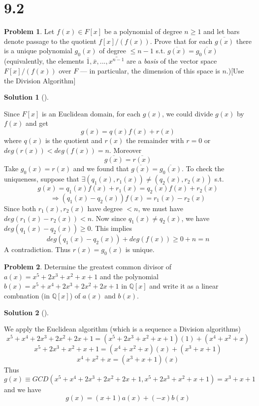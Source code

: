 \documentclass{article}
\theoremstyle{definition}
\newtheorem{prob}{Problem}
\newtheorem*{sol}{Solution}
\newenvironment{sols}[1][]{%
  \begin{sol}[#1]$ $\par\nobreak\ignorespaces
}{%
  \end{sol}
}
\begin{document}
\section*{9.2}

\setcounter{prob}{0}
\begin{prob}
  Let $f(x) \in F[x]$ be a polynomial of degree $n \geq 1$ and let bars denote passage to the quotient $f[x]/(f(x))$. Prove that for each $\overline{g(x)}$ there is a unique polynomial $g_0(x)$ of degree $\leq n - 1$ s.t. $\overline{g(x)} = \overline{g_0(x)}$ (equivalently, the elements $\bar{1}, \bar{x}, ...,\bar{x^{n - 1}}$ are a \textit{basis} of the vector space $F[x]/(f(x))$ over $F$ --- in particular, the dimension of this space is $n$.)[Use the Division Algorithm]
\end{prob}

\begin{sols}
  Since $F[x]$ is an Euclidean domain, for each $g(x)$, we could divide $g(x)$ by $f(x)$ and get
  \[
    g(x) = q(x) f(x) + r(x)
  \]
  where $q(x)$ is the quotient and $r(x)$ the remainder with $r = 0$ or $deg(r(x)) < deg(f(x)) = n$. Moreover
  \[
    \overline{g(x)} = \overline{r(x)}
  \]
  Take $g_0(x) = r(x)$ and we found that $\overline{g(x)} = \overline{g_0(x)}$. To check the uniqueness, suppose that $\exists (q_1(x), r_1(x)) \neq (q_2(x), r_2(x))$ s.t.
  \[
    g(x) = q_1(x) f(x) + r_1(x) = q_2(x) f(x) + r_2(x)
  \]
  \[
    \Rightarrow (q_1(x) - q_2(x)) f(x) = r_1(x) - r_2(x)
  \]
  Since both $r_1(x), r_2(x)$ have degree $<n$, we must have $deg(r_1(x) - r_2(x)) < n$. Now since $q_1(x) \neq q_2(x)$, we have $deg(q_1(x) - q_2(x)) \geq 0$. This implies 
  \[
    deg(q_1(x) - q_2(x)) + deg(f(x)) \geq 0 + n = n
  \]
  A contradiction. Thus $r(x) = g_0(x)$ is unique. 
\end{sols}

\setcounter{prob}{8}
\begin{prob}
  Determine the greatest common divisor of $a(x) = x^5 + 2 x^3 + x^2 + x + 1$ and the polynomial $b(x) = x^5 + x^4 + 2x^3 + 2x^2 + 2x + 1$ in $\mathbb{Q}[x]$ and write it as a linear combnation (in $\mathbb{Q}[x]$) of $a(x)$ and $b(x)$. 
\end{prob}

\begin{sols}
  We apply the Euclidean algorithm (which is a sequence a Division algorithms)
  \[
    x^5 + x^4 + 2x^3 + 2x^2 + 2x + 1 = (x^5 + 2 x^3 + x^2 + x + 1) (1) + (x^4 + x^2 + x)
  \]
  \[
    x^5 + 2 x^3 + x^2 + x + 1 = (x^4 + x^2 + x) (x) + (x^3 + x + 1)
  \]
  \[
    x^4 + x^2 + x = (x^3 + x + 1) (x)
  \]
  Thus 
  \[
    g(x) \equiv GCD(x^5 + x^4 + 2x^3 + 2x^2 + 2x + 1, x^5 + 2 x^3 + x^2 + x + 1) = x^3 + x + 1
  \]
  and we have
  \[
    g(x) = (x+1) a(x) + (-x) b(x)
  \]
\end{sols}
\end{document}
